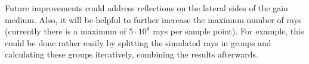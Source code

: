 Future improvements could address reflections on the lateral sides of the gain
medium. Also, it will be helpful to further increase the maximum number of rays
(currently there is a maximum of $5\cdot10^8$ rays per sample point). For
example, this could be done rather easily by splitting the simulated rays in
groups and calculating these groups iteratively, combining the results
afterwards.


